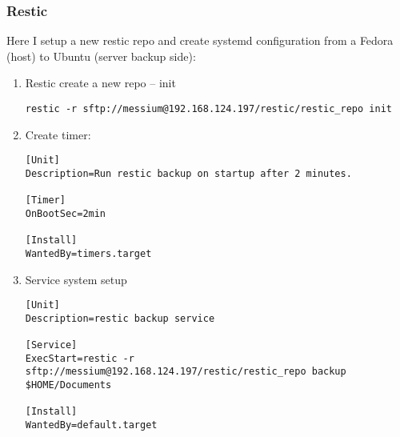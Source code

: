 \documentclass[11pt]{article}
\begin{document}
\subsubsection{Restic}
\label{sec:org8c36b4d}
Here I setup a new restic repo and create systemd configuration from a Fedora (host) to Ubuntu (server backup side):
\begin{enumerate}
\item Restic create a new repo -- init
\label{sec:org1d086e1}


\begin{verbatim}
restic -r sftp://messium@192.168.124.197/restic/restic_repo init
\end{verbatim}
\item Create timer:
\label{sec:org5616f04}

\begin{verbatim}
[Unit]
Description=Run restic backup on startup after 2 minutes.

[Timer]
OnBootSec=2min

[Install]
WantedBy=timers.target
\end{verbatim}
\item Service system setup
\label{sec:orgf6a94e9}

\begin{verbatim}
[Unit]
Description=restic backup service

[Service]
ExecStart=restic -r sftp://messium@192.168.124.197/restic/restic_repo backup $HOME/Documents

[Install]
WantedBy=default.target
\end{verbatim}
\end{enumerate}
\end{document}
